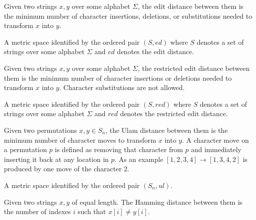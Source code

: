 \begin{definition}
\label{Edit Distance}
    Given two strings $x, y$ over some alphabet $\Sigma$, the edit distance between them is the minimum number of character insertions, deletions, or substitutions needed to transform $x$ into $y$.
\end{definition}

\begin{definition}
\label{Edit Metric}
    A metric space identified by the ordered pair $(S, ed)$ where $S$ denotes a set of strings over some alphabet $\Sigma$ and $ed$ denotes the edit distance.
\end{definition}

\begin{definition}
    Given two strings $x, y$ over some alphabet $\Sigma$, the restricted edit distance between them is the minimum number of character insertions or deletions needed to transform $x$ into $y$. Character substitutions are not allowed.
\end{definition}

\begin{definition}
\label{RestrictedMetric}
    A metric space identified by the ordered pair $(S, red)$ where $S$ denotes a set of strings over some alphabet $\Sigma$ and $red$ denotes the restricted edit distance.
\end{definition}

\begin{definition}
\label{Ulam Distance}
    Given two permutations $x, y \in S_n$, the Ulam distance between them is the minimum number of character moves to transform $x$ into $y$. A character move on a permutation $p$ is defined as removing that character from $p$ and immediately inserting it back at any location in $p$. As an example $[1, 2, 3, 4] \rightarrow [1, 3, 4, 2]$ is produced by one move of the character 2.
\end{definition}

\begin{definition}
\label{Ulam Metric}
    A metric space identified by the ordered pair $(S_n, ul)$.
\end{definition}

\begin{definition}
    Given two strings $x, y$ of equal length. The Hamming distance between them is the number of indexes $i$ such that $x[i] \neq y[i]$.
\end{definition}

